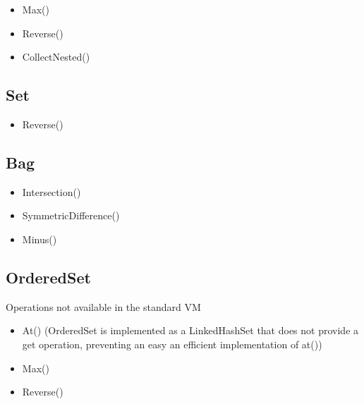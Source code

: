 \begin{itemize}
  \item Max()
  \item Reverse()
  \item CollectNested()
\end{itemize}

\subsection{Set}

\begin{itemize}
  \item Reverse()
\end{itemize}

\subsection{Bag}

\begin{itemize}
  \item Intersection()
  \item SymmetricDifference()
  \item Minus()
\end{itemize}

\subsection{OrderedSet}
 
 Operations not available in the standard VM

\begin{itemize}
  \item At() (OrderedSet is implemented as a LinkedHashSet that does not
  provide a get operation, preventing an easy an efficient implementation of at())
  \item Max()
  \item Reverse()
\end{itemize}



